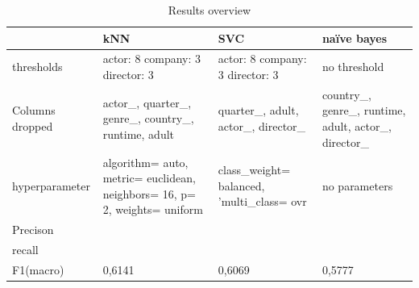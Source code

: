 
\begin{center}
\begin{table}
	\begin{tabular}{ | p{} | p{} | p{2.5cm} | p{3cm}|}
    \hline
    & kNN & SVC & na\"{i}ve bayes\\ \hline
	thresholds & actor: 8 company: 3 director: 3 & actor: 8 company: 3 director: 3 & no threshold \\  \hline
    Columns dropped & actor\_, quarter\_, genre\_, country\_, runtime, adult & quarter\_, adult, actor\_, director\_ & country\_, genre\_, runtime, adult, actor\_, director\_  \\ \hline
    hyperparameter & algorithm= auto, metric= euclidean, neighbors= 16, p= 2, weights= uniform & class\_weight= balanced, 'multi\_class= ovr & no parameters  \\ \hline
    Precison&  &  &  \\ \hline
	recall &  &  &   \\ \hline
	F1(macro) & 0,6141 & 0,6069 & 0,5777 \\ \hline
    \end{tabular}
    \caption{Results overview} 
   \label{tab:values}
\end{table}
\end{center}
